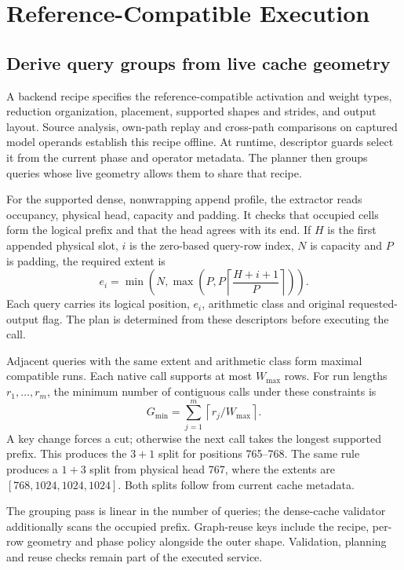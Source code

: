 \section{Reference-Compatible Execution}
\label{sec:method}
\subsection{Derive query groups from live cache geometry}
A backend recipe specifies the reference-compatible activation and weight types, reduction organization, placement, supported shapes and strides, and output layout. Source analysis, own-path replay and cross-path comparisons on captured model operands establish this recipe offline. At runtime, descriptor guards select it from the current phase and operator metadata. The planner then groups queries whose live geometry allows them to share that recipe.

For the supported dense, nonwrapping append profile, the extractor reads occupancy, physical head, capacity and padding. It checks that occupied cells form the logical prefix and that the head agrees with its end. If $H$ is the first appended physical slot, $i$ is the zero-based query-row index, $N$ is capacity and $P$ is padding, the required extent is
\begin{equation}
 e_i=\min\!\left(N,\max\!\left(P,P\left\lceil\frac{H+i+1}{P}\right\rceil\right)\right).
 \label{eq:extent}
\end{equation}
Each query carries its logical position, $e_i$, arithmetic class and original requested-output flag. The plan is determined from these descriptors before executing the call.

Adjacent queries with the same extent and arithmetic class form maximal compatible runs. Each native call supports at most $W_{\max}$ rows. For run lengths $r_1,\ldots,r_m$, the minimum number of contiguous calls under these constraints is
\begin{equation}
 G_{\min}=\sum_{j=1}^{m}\left\lceil r_j/W_{\max}\right\rceil.
 \label{eq:groups}
\end{equation}
A key change forces a cut; otherwise the next call takes the longest supported prefix. This produces the $3+1$ split for positions 765--768. The same rule produces a $1+3$ split from physical head 767, where the extents are $[768,1024,1024,1024]$. Both splits follow from current cache metadata.

The grouping pass is linear in the number of queries; the dense-cache validator additionally scans the occupied prefix. Graph-reuse keys include the recipe, per-row geometry and phase policy alongside the outer shape. Validation, planning and reuse checks remain part of the executed service.

